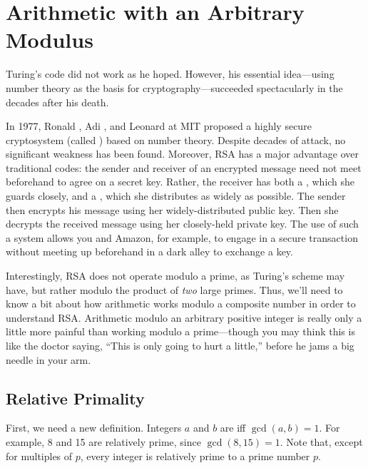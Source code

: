 \section{Arithmetic with an Arbitrary Modulus}\label{arithmetic_modn_sec}

Turing's code did not work as he hoped.  However, his essential
idea---using number theory as the basis for cryptography---succeeded
spectacularly in the decades after his death.

In 1977, Ronald , Adi , and
Leonard  at MIT proposed a highly secure cryptosystem
(called \textbf{}) based on number theory.  Despite decades
of attack, no significant weakness has been found.  Moreover, RSA has
a major advantage over traditional codes: the sender and receiver of
an encrypted message need not meet beforehand to agree on a secret
key.  Rather, the receiver has both a , which she
guards closely, and a , which she distributes as
widely as possible.  The sender then encrypts his message using her
widely-distributed public key.  Then she decrypts the received message
using her closely-held private key.  The use of such a  system allows you and Amazon, for example, to engage
in a secure transaction without meeting up beforehand in a dark alley
to exchange a key.

Interestingly, RSA does not operate modulo a prime, as Turing's scheme
may have, but rather modulo the product of \emph{two} large primes.
Thus, we'll need to know a bit about how arithmetic works modulo a
composite number in order to understand RSA.  Arithmetic modulo an
arbitrary positive integer is really only a little more painful than
working modulo a prime---though you may think this is like
the doctor saying, ``This is only going to hurt a little,'' before he
jams a big needle in your arm.

\subsection{Relative Primality}

First, we need a new definition.  Integers $a$ and $b$ are
 iff $\gcd(a, b) = 1$.  For example, 8 and 15
are relatively prime, since $\gcd(8, 15) = 1$.  Note that, except for
multiples of $p$, every integer is relatively prime to a prime number
$p$.

